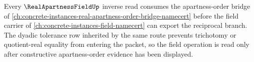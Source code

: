 Every $\RealApartnessFieldUp$ inverse read consumes the apartness-order bridge of \autoref{ch:concrete-instances-real-apartness-order-bridge-namecert} before the field carrier of \autoref{ch:concrete-instances-field-namecert} can export the reciprocal branch. The dyadic tolerance row inherited by the same route prevents trichotomy or quotient-real equality from entering the packet, so the field operation is read only after constructive apartness-order evidence has been displayed.
